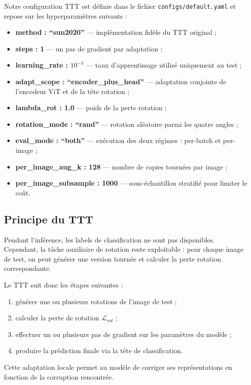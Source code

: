 \documentclass[12pt,a4paper]{report}
\begin{document}
	Notre configuration TTT est définie dans le fichier \texttt{configs/default.yaml} et repose sur les hyperparamètres suivants :
	\begin{itemize}
		\item \textbf{method : ``sun2020''} — implémentation fidèle du TTT original ;
		\item \textbf{steps : 1} — un pas de gradient par adaptation ;
		\item \textbf{learning\_rate : $10^{-3}$} — taux d’apprentissage utilisé uniquement au test ;
		\item \textbf{adapt\_scope : ``encoder\_plus\_head''} — adaptation conjointe de l’encodeur ViT et de la tête rotation ;
		\item \textbf{lambda\_rot : 1.0} — poids de la perte rotation ;
		\item \textbf{rotation\_mode : ``rand''} — rotation aléatoire parmi les quatre angles ;
		\item \textbf{eval\_mode : ``both''} — exécution des deux régimes : per-batch et per-image ;
		\item \textbf{per\_image\_aug\_k : 128} — nombre de copies tournées par image ;
		\item \textbf{per\_image\_subsample : 1000} — sous-échantillon stratifié pour limiter le coût.
	\end{itemize}
	
	\subsection{Principe du TTT}
	
	Pendant l’inférence, les labels de classification ne sont pas disponibles.  
	Cependant, la tâche auxiliaire de rotation reste exploitable : pour chaque image de test, on peut générer une version tournée et calculer la perte rotation correspondante.
	
	Le TTT suit donc les étapes suivantes :
	\begin{enumerate}
		\item générer une ou plusieurs rotations de l’image de test ;
		\item calculer la perte de rotation $\mathcal{L}_{rot}$ ;
		\item effectuer un ou plusieurs pas de gradient sur les paramètres du modèle ;
		\item produire la prédiction finale via la tête de classification.
	\end{enumerate}
	
	Cette adaptation locale permet au modèle de corriger ses représentations en fonction de la corruption rencontrée.
	
\end{document}
